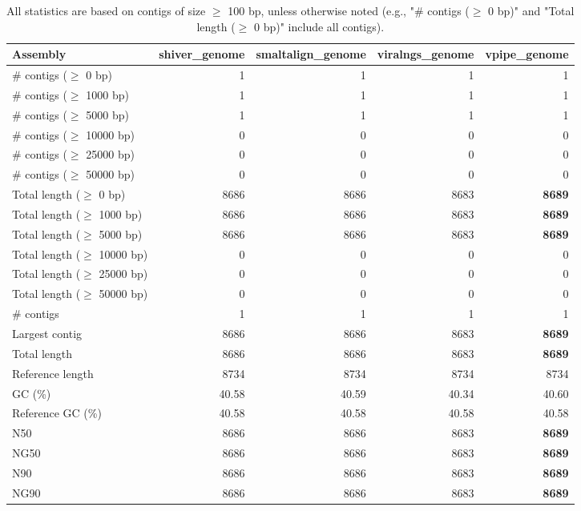 \documentclass[12pt,a4paper]{article}
\begin{document}
\begin{table}[ht]
\begin{center}
\caption{All statistics are based on contigs of size $\geq$ 100 bp, unless otherwise noted (e.g., "\# contigs ($\geq$ 0 bp)" and "Total length ($\geq$ 0 bp)" include all contigs).}
\begin{tabular}{|l*{4}{|r}|}
\hline
Assembly & shiver\_genome & smaltalign\_genome & viralngs\_genome & vpipe\_genome \\ \hline
\# contigs ($\geq$ 0 bp) & 1 & 1 & 1 & 1 \\ \hline
\# contigs ($\geq$ 1000 bp) & 1 & 1 & 1 & 1 \\ \hline
\# contigs ($\geq$ 5000 bp) & 1 & 1 & 1 & 1 \\ \hline
\# contigs ($\geq$ 10000 bp) & 0 & 0 & 0 & 0 \\ \hline
\# contigs ($\geq$ 25000 bp) & 0 & 0 & 0 & 0 \\ \hline
\# contigs ($\geq$ 50000 bp) & 0 & 0 & 0 & 0 \\ \hline
Total length ($\geq$ 0 bp) & 8686 & 8686 & 8683 & {\bf 8689} \\ \hline
Total length ($\geq$ 1000 bp) & 8686 & 8686 & 8683 & {\bf 8689} \\ \hline
Total length ($\geq$ 5000 bp) & 8686 & 8686 & 8683 & {\bf 8689} \\ \hline
Total length ($\geq$ 10000 bp) & 0 & 0 & 0 & 0 \\ \hline
Total length ($\geq$ 25000 bp) & 0 & 0 & 0 & 0 \\ \hline
Total length ($\geq$ 50000 bp) & 0 & 0 & 0 & 0 \\ \hline
\# contigs & 1 & 1 & 1 & 1 \\ \hline
Largest contig & 8686 & 8686 & 8683 & {\bf 8689} \\ \hline
Total length & 8686 & 8686 & 8683 & {\bf 8689} \\ \hline
Reference length & 8734 & 8734 & 8734 & 8734 \\ \hline
GC (\%) & 40.58 & 40.59 & 40.34 & 40.60 \\ \hline
Reference GC (\%) & 40.58 & 40.58 & 40.58 & 40.58 \\ \hline
N50 & 8686 & 8686 & 8683 & {\bf 8689} \\ \hline
NG50 & 8686 & 8686 & 8683 & {\bf 8689} \\ \hline
N90 & 8686 & 8686 & 8683 & {\bf 8689} \\ \hline
NG90 & 8686 & 8686 & 8683 & {\bf 8689} \\ \hline

\end{tabular}
\end{center}
\end{table}
\end{document}
